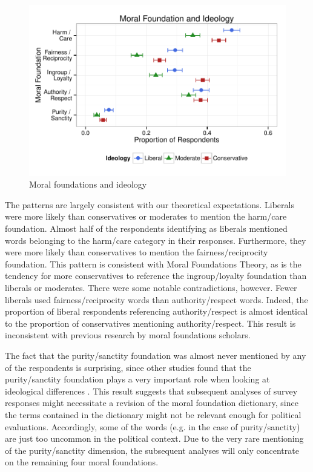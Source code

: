 \documentclass[12pt]{article}
\begin{document}
\begin{figure}[h]\centering
\includegraphics[scale=.9]{../calc/fig/fig1prop.pdf}
\caption{Moral foundations and ideology}\label{fig:1prop}
\end{figure}

The patterns are largely consistent with our theoretical expectations. Liberals were more likely than conservatives or moderates to mention the harm/care foundation. Almost half of the respondents identifying as liberals mentioned words belonging to the harm/care category in their responses. Furthermore, they were more likely than conservatives to mention the fairness/reciprocity foundation. This pattern is consistent with Moral Foundations Theory, as is the tendency for more conservatives to reference the ingroup/loyalty foundation than liberals or moderates. There were some notable contradictions, however. Fewer liberals used fairness/reciprocity words than authority/respect words. Indeed, the proportion of liberal respondents referencing authority/respect is almost identical to the proportion of conservatives mentioning authority/respect. This result is inconsistent with previous research by moral foundations scholars.

The fact that the purity/sanctity foundation was almost never mentioned by any of the respondents is surprising, since other studies found that the purity/sanctity foundation plays a very important role when looking at ideological differences \citep{koleva2012tracing}. This result suggests that subsequent analyses of survey responses might necessitate a revision of the moral foundation dictionary, since the terms contained in the dictionary might not be relevant enough for political evaluations. Accordingly, some of the words (e.g. in the case of purity/sanctity) are just too uncommon in the political context. Due to the very rare mentioning of the purity/sanctity dimension, the subsequent analyses will only concentrate on the remaining four moral foundations.
\end{document}
